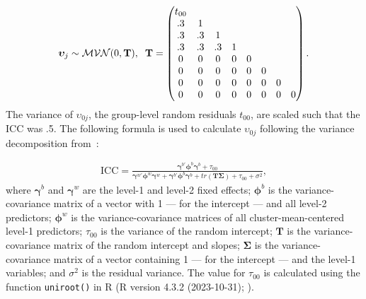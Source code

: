 \documentclass[3p,12pt,a4paper]{elsarticle}
\begin{document}
\begin{align}
    \boldsymbol{\upsilon}_{j} \sim \mathcal{MVN}(0, \mathbf{T}), \hspace{.2cm}
    \mathbf{T} = \begin{pmatrix}
        t_{00}& & & & & & \\
          .3& 1& & & & & \\
          .3& .3& 1& & & & \\
          .3& .3& .3& 1& & & \\
          0& 0& 0& 0& 0& & \\
          0& 0& 0& 0& 0& 0& \\
          0& 0& 0& 0& 0& 0& 0 \\
          0& 0& 0& 0& 0& 0& 0& 0
    \end{pmatrix} \label{eq:T}.
\end{align}
The variance of $\upsilon_{0j}$, the group-level random residuals $t_{00}$, are scaled such that the ICC was .5. The following formula is used to calculate $\upsilon_{0j}$ following the variance decomposition from~\cite{rights2019}:

\begin{align}
\label{eq:variancedecomposition}
\text{ICC} = \frac{\boldsymbol{\gamma}^{b'}\boldsymbol{\phi}^{b}\boldsymbol{\gamma}^{b} + \tau_{00}}{\boldsymbol{\gamma}^{w'}\boldsymbol{\phi}^{w}\boldsymbol{\gamma}^{w} + \boldsymbol{\gamma}^{b'}\boldsymbol{\phi}^{b}\boldsymbol{\gamma}^{b} + tr(\mathbf{T}\boldsymbol{\Sigma})+ \tau_{00} + \sigma^{2}},
\end{align} where $\boldsymbol{\gamma}^{b}$ and $\boldsymbol{\gamma}^{w}$ are the level-1 and level-2 fixed effects; $\boldsymbol{\phi}^{b}$ is the variance-covariance matrix of a vector with 1 --- for the intercept --- and all level-2 predictors; $\boldsymbol{\phi}^{w}$ is the variance-covariance matrices of all cluster-mean-centered level-1 predictors; $\tau_{00}$ is the variance of the random intercept; $\mathbf{T}$ is the variance-covariance matrix of the random intercept and slopes; $\boldsymbol{\Sigma}$ is the variance-covariance matrix of a vector containing 1 --- for the intercept --- and the level-1 variables; and $\sigma^{2}$ is the residual variance. The value for $\tau_{00}$ is calculated using the function \texttt{uniroot()} in R (R version 4.3.2 (2023-10-31); ).
\end{document}
